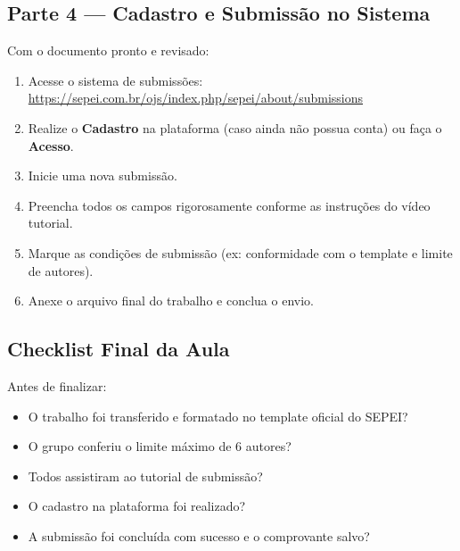 
\subsection{Parte 4 — Cadastro e Submissão no Sistema}

\begin{boxAtividade}

Com o documento pronto e revisado:

\begin{enumerate}
\item Acesse o sistema de submissões: \url{https://sepei.com.br/ojs/index.php/sepei/about/submissions}
\item Realize o \textbf{Cadastro} na plataforma (caso ainda não possua conta) ou faça o \textbf{Acesso}.
\item Inicie uma nova submissão.
\item Preencha todos os campos rigorosamente conforme as instruções do vídeo tutorial.
\item Marque as condições de submissão (ex: conformidade com o template e limite de autores).
\item Anexe o arquivo final do trabalho e conclua o envio.
\end{enumerate}

\end{boxAtividade}


\subsection{Checklist Final da Aula}

\begin{boxAtividade}

Antes de finalizar:

\begin{itemize}
\item O trabalho foi transferido e formatado no template oficial do SEPEI?
\item O grupo conferiu o limite máximo de 6 autores?
\item Todos assistiram ao tutorial de submissão?
\item O cadastro na plataforma foi realizado?
\item A submissão foi concluída com sucesso e o comprovante salvo?
\end{itemize}

\end{boxAtividade}
